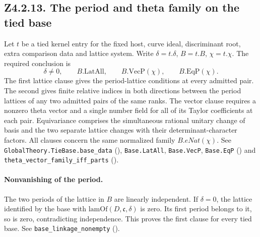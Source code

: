 \subsection{Z4.2.13. The period and theta family on the tied base}\label{r8:Z4.2.13}
Let \(t\) be a tied kernel entry for the fixed host, curve ideal, discriminant root, extra comparison data and lattice system. Write \(\delta=t.\delta\), \(B=t.B\), \(\chi=t.\chi\). The required conclusion is
\[
 \delta\ne0,\qquad B.\mathrm{LatAll},\qquad B.\mathrm{VecP}(\chi),\qquad B.\mathrm{EqP}(\chi).
\]
The first lattice clause gives the period-lattice conditions at every admitted pair. The second gives finite relative indices in both directions between the period lattices of any two admitted pairs of the same ranks. The vector clause requires a nonzero theta vector and a single number field for all of its Taylor coefficients at each pair. Equivariance comprises the simultaneous rational unitary change of basis and the two separate lattice changes with their determinant-character factors. All clauses concern the same normalized family \(B.eNat(\chi)\). See \nolinkurl{GlobalTheory.TieBase.base_data} (), \nolinkurl{Base.LatAll}, \nolinkurl{Base.VecP}, \nolinkurl{Base.EqP} () and \nolinkurl{theta_vector_family_iff_parts} ().

\paragraph{Nonvanishing of the period.}
The two periods of the lattice in \(B\) are linearly independent. If \(\delta=0\), the lattice identified by the base with \(\mathrm{lamOf}(D,\mathfrak c,\delta)\) is zero. Its first period belongs to it, so is zero, contradicting independence. This proves the first clause for every tied base. See \nolinkurl{base_linkage_nonempty} ().

